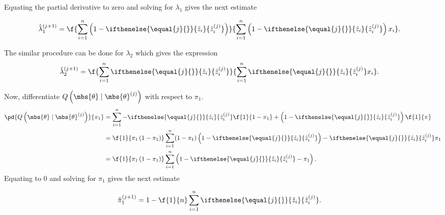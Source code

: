 \documentclass{tufte-handout}
\newcommand{\zhat}[2][{}]{\ifthenelse{\equal{#1}{}}{\hat{z}_{#2}}{\hat{z}_{#2}^{(#1)}}}
\begin{document}
    Equating the partial derivative to zero and solving for $\lambda_{1}$ gives the next estimate
    \begin{blackBox}
        \begin{align}
            \hat{\lambda}_{1}^{(j+1)} 
            &= 
            \f{
                \sum_{i=1}^{n} \left(1-\zhat[j]{i}\right)
            }{
                \sum_{i=1}^{n} \left(1-\zhat[j]{i}\right) x_{i}  
            }.
        \end{align}
    \end{blackBox}
    \begin{blackBox}
        The similar procedure can be done for $\lambda_{2}$ which gives the expression
        \begin{align}
            \hat{\lambda}_{2}^{(j+1)} 
            &= 
            \f{
                \sum_{i=1}^{n} \zhat[j]{i}
            }{
                \sum_{i=1}^{n}\zhat[j]{i} x_{i}  
            }.
        \end{align}
    \end{blackBox}
    Now, differentiate $Q\left(\mbs{\theta}\mid\mbs{\theta}^{(j)}\right)$ with respect to $\pi_{1}$.
    \begin{align}
        \pd{
            Q\left( \mbs{\theta}\mid\mbs{\theta}^{(j)} \right)
        }{
            \pi_{1}
        }
        &=
        \sum_{i=1}^{n}-\zhat[j]{i}\f{1}{1-\pi_{1}} + \left(1-\zhat[j]{i}\right)\f{1}{ \pi}\\
        &=
        \f{1}{\pi_{1}\left( 1-\pi_{1} \right)}\sum_{i=1}^{n} (1-\pi_{1})\left(1-\zhat[j]{i}\right) -\zhat[j]{i}\pi_{1}\\
        &=
        \f{1}{\pi_{1}\left( 1-\pi_{1} \right)}\sum_{i=1}^{n}\left(1 -\zhat[j]{i} - \pi_{1}\right).
    \end{align}
    Equating to $0$ and solving for $\pi_{1}$ gives the next estimate
    \begin{blackBox}    
        \begin{align}
            \hat{\pi}_{1}^{(j+1)} &= 1 - \f{1}{n}\sum_{i=1}^{n}\zhat[j]{i}.
        \end{align}
    \end{blackBox}        

    
    
\end{document}
